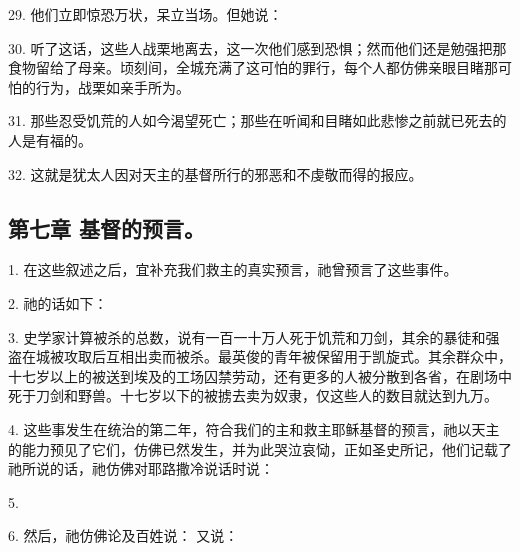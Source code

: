 29. 他们立即惊恐万状，呆立当场。但她说：\par

30. 听了这话，这些人战栗地离去，这一次他们感到恐惧；然而他们还是勉强把那食物留给了母亲。顷刻间，全城充满了这可怕的罪行，每个人都仿佛亲眼目睹那可怕的行为，战栗如亲手所为。\par

31. 那些忍受饥荒的人如今渴望死亡；那些在听闻和目睹如此悲惨之前就已死去的人是有福的。\par

32. 这就是犹太人因对天主的基督所行的邪恶和不虔敬而得的报应。\par


\subsection{第七章 基督的预言。}

1. 在这些叙述之后，宜补充我们救主的真实预言，祂曾预言了这些事件。\par

2. 祂的话如下：\par

3. 史学家计算被杀的总数，说有一百一十万人死于饥荒和刀剑，其余的暴徒和强盗在城被攻取后互相出卖而被杀。最英俊的青年被保留用于凯旋式。其余群众中，十七岁以上的被送到埃及的工场囚禁劳动，还有更多的人被分散到各省，在剧场中死于刀剑和野兽。十七岁以下的被掳去卖为奴隶，仅这些人的数目就达到九万。\par

4. 这些事发生在统治的第二年，符合我们的主和救主耶稣基督的预言，祂以天主的能力预见了它们，仿佛已然发生，并为此哭泣哀恸，正如圣史所记，他们记载了祂所说的话，祂仿佛对耶路撒冷说话时说：\par

5. \par

6. 然后，祂仿佛论及百姓说： 又说：\par

